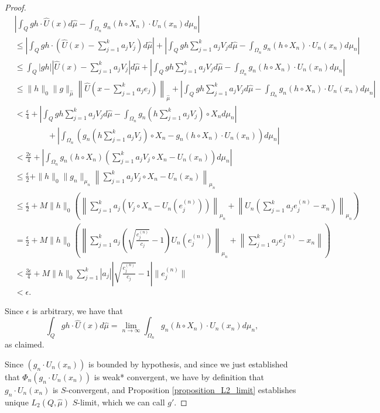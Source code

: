 \documentclass[10pt,a4paper]{amsart}
\def \HMU{\hat{\mu}}
\def \HU{\hat{U}}
\begin{document}
\begin{proof}
	\begin{align*}
		&\left|\int_{Q}gh\cdot\HU(x)d\HMU-\int_{\Omega_n}g_n\left(h\circ X_n\right)\cdot U_n(x_n)d\mu_n \right|\\
		&\leq\left|\int_{Q}gh\cdot\left(\HU(x)-\sum_{j=1}^ka_jV_j\right)d\HMU \right|+\left|\int_{Q}gh\sum_{j=1}^ka_jV_jd\HMU-\int_{\Omega_n}g_n\left(h\circ X_n\right)\cdot U_n(x_n)d\mu_n\right|\\
		&\leq \int_{Q} |gh|\left|\HU(x)-\sum_{j=1}^ka_jV_j \right| d\HMU+\left|\int_{Q}gh\sum_{j=1}^ka_jV_jd\HMU-\int_{\Omega_n}g_n\left(h\circ X_n\right)\cdot U_n(x_n)d\mu_n\right|\\
		&\leq \|h\|_0\|g\|_{\HMU}\left\|\HU\left(x-\sum_{j=1}^ka_je_j\right)\right\|_{\HMU}+\left|\int_{Q}gh\sum_{j=1}^ka_jV_jd\HMU-\int_{\Omega_n}g_n\left(h\circ X_n\right)\cdot U_n(x_n)d\mu_n\right|\\
		&<\frac{\epsilon}{4}+\left|\int_{Q}gh\sum_{j=1}^ka_jV_jd\HMU-\int_{\Omega_n}g_n\left(h\sum_{j=1}^ka_jV_j\right)\circ X_nd\mu_n\right|\\
		&\qquad\qquad+\left|\int_{\Omega_n}\left(g_n\left(h\sum_{j=1}^ka_jV_j\right)\circ X_n-g_n(h\circ X_n)\cdot U_n(x_n) \right)d\mu_n\right|\\
		&<\frac{2\epsilon}{4}+\left|\int_{\Omega_n}g_n(h\circ X_n)\left(\sum_{j=1}^k a_jV_j\circ X_n-U_n(x_n)\right)d\mu_n\right|\\
		&\leq\frac{\epsilon}{2}+\|h\|_0\|g_n\|_{\mu_n}\left\|\sum_{j=1}^k a_jV_j\circ X_n-U_n(x_n)\right\|_{\mu_n}\\
		&\leq\frac{\epsilon}{2}+M\|h\|_0\left(\left\|\sum_{j=1}^ka_j\left(V_j\circ X_n-U_n(e_j^{(n)})\right)\right\|_{\mu_n}+\left\|U_n\left(\sum_{j=1}^ka_je_j^{(n)}-x_n\right)\right\|_{\mu_n}\right)\\
		&=\frac{\epsilon}{2}+M\|h\|_0\left(\left\|\sum_{j=1}^ka_j\left(\sqrt{\frac{c_j^{(n)}}{c_j}}-1\right)U_n(e_j^{(n)})\right\|_{\mu_n}+\left\|\sum_{j=1}^ka_je_j^{(n)}-x_n \right\|\right)\\
		&<\frac{3\epsilon}{4}+M\|h\|_0\sum_{j=1}^k|a_j|\left|\sqrt{\frac{c_j^{(n)}}{c_j}}-1 \right|\|e_j^{(n)}\|\\
		&<\epsilon.
	\end{align*}
	
	Since $\epsilon$ is arbitrary, we have that \[\int_{Q}gh\cdot\HU(x)d\HMU=\lim_{n\rightarrow\infty}\int_{\Omega_n}g_n\left(h\circ X_n\right)\cdot U_n(x_n)d\mu_n,\] as claimed.
	
	Since $(g_n\cdot U_n(x_n))$ is bounded by hypothesis, and since we just established that $\Phi_n(g_n\cdot U_n(x_n))$ is weak* convergent, we have by definition that $g_n\cdot U_n(x_n)$ is $S$-convergent, and Proposition \ref{proposition_L2_limit} establishes unique $L_2(Q,\HMU)$ $S$-limit, which we can call $g'$. 
	

\end{proof}
\end{document}
